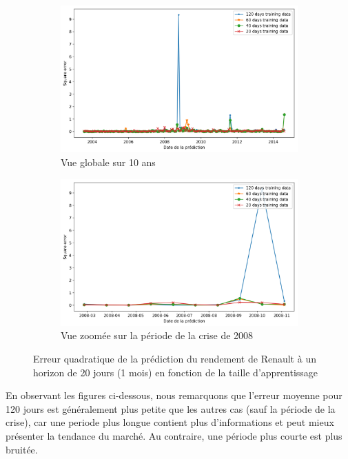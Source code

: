 \begin{figure}[H]
\centering
\begin{subfigure}{.5\textwidth}
\centering
\includegraphics[width=.9\linewidth, scale=0.2]
{plot/SE_Trainingset.png}
\caption{Vue globale sur 10 ans}
\label{fig:SE_Ts1}
\end{subfigure}%
\begin{subfigure}{.5\textwidth}
\centering
\includegraphics[width=.9\linewidth, scale=0.2]
{plot/SE_Trainingset_s.png}
\caption{Vue zoomée sur la période de la crise de 2008}
\label{fig:SE_Ts2}
\end{subfigure}
\caption{Erreur quadratique de la prédiction du rendement de Renault à un horizon de 20 jours (1 mois) en fonction de la taille d'apprentissage}
\label{fig:SE_Trainingset}
\end{figure}

En observant les figures ci-dessous, nous remarquons que l'erreur moyenne pour 120 jours est généralement plus petite que les autres cas (sauf la période de la crise), car une periode plus longue contient plus d'informations et peut mieux présenter la tendance du marché. Au contraire, une période plus courte est plus bruitée.

